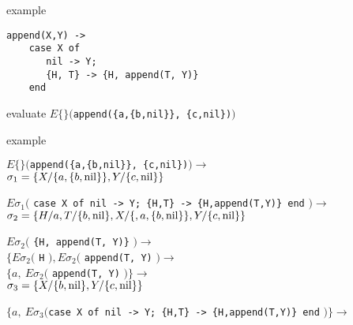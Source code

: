 \begin{frame}[fragile]{example}

\begin{verbatim}
append(X,Y) ->
    case X of 
       nil -> Y; 
       {H, T} -> {H, append(T, Y)} 
    end
\end{verbatim}

\pause\vspace{20pt}
evaluate $E\lbrace\rbrace( ${\tt append(\{a,\{b,nil\}\}, \{c,nil\})}$ )$

\end{frame}

\begin{frame}{example}

\begin{eval} 
\pause $E\lbrace\rbrace( ${\tt append(\{a,\{b,nil\}\}, \{c,nil\})}$ ) \rightarrow$\\
\pause\hspace{10pt} $\sigma_1 = \lbrace X/\lbrace a, \lbrace b, {\rm nil}\rbrace\rbrace, Y/\lbrace c, {\rm nil}\rbrace \rbrace$\\
\end{eval}

\vspace{10pt}

\begin{eval} 
\pause $E\sigma_1($ {\tt case X of nil -> Y; \{H,T\} -> \{H,append(T,Y)\} end} $) \rightarrow$\\
\pause\hspace{10pt}  $\sigma_2 = \lbrace H/a, T/\lbrace b, {\rm nil}\rbrace, X/\lbrace, a, \lbrace b, {\rm nil}\rbrace\rbrace, Y/\lbrace c, {\rm nil}\rbrace \rbrace$\\
\end{eval}

\vspace{10pt}

\begin{eval} 
\pause $E\sigma_2($ {\tt \{H, append(T, Y)\}} $) \rightarrow$\\
\pause $\lbrace E\sigma_2($ {\tt  H} $), E\sigma_2($ {\tt append(T, Y)} $) \rightarrow$\\
\pause $\lbrace a, \ E\sigma_2($ {\tt  append(T, Y)} $) \rbrace \rightarrow$\\
\pause\hspace{10pt} $\sigma_3 = \lbrace X/ \lbrace b, {\rm nil}\rbrace, Y/\lbrace c, {\rm nil}\rbrace \rbrace$\\
\end{eval}

\vspace{10pt}

\begin{eval} 
\pause $\lbrace a ,\  E\sigma_3(${\tt case X of nil -> Y; \{H,T\} -> \{H,append(T,Y)\} end} $)\rbrace \rightarrow$\\
\end{eval}

\end{frame}


